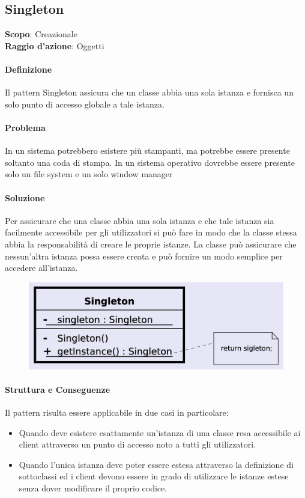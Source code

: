 \subsection{Singleton}


\textbf{Scopo}: Creazionale \\
\textbf{Raggio d'azione}: Oggetti

\paragraph{Definizione} Il pattern Singleton assicura che un classe abbia una sola istanza e fornisca un solo punto di accesso globale a tale istanza.

\paragraph{Problema} In un sistema potrebbero esistere più stampanti, ma potrebbe essere presente soltanto una coda di stampa. In un sistema operativo dovrebbe essere presente solo un file system e un solo window manager

\paragraph{Soluzione} Per assicurare che una classe abbia una sola istanza e che tale istanza sia facilmente accessibile per gli utilizzatori si può fare in modo che la classe stessa abbia la responsabilità di creare le proprie istanze. La classe può assicurare che nessun’altra istanza possa essere creata e può fornire un modo semplice per accedere all’istanza.

\begin{figure}[H]
    \centering
    \includegraphics[width=0.4\linewidth]{assets/pattern/singleton/singleton-struttura.png}
\end{figure}

\paragraph{Struttura e Conseguenze} Il pattern risulta essere applicabile in due casi in particolare:
\begin{itemize}
    \item Quando deve esistere esattamente un’istanza di una classe resa accessibile ai client attraverso un punto di accesso noto a tutti gli utilizzatori.
    \item Quando l’unica istanza deve poter essere estesa attraverso la definizione di sottoclassi ed i client devono essere in grado di utilizzare le istanze estese senza dover modificare il proprio codice.
\end{itemize}

